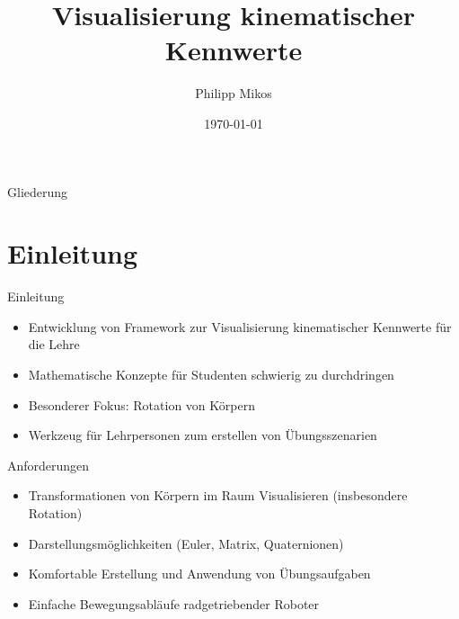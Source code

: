 \documentclass{beamer}
\title{Visualisierung kinematischer Kennwerte}
\author{Philipp Mikos}
\date{\today}
\begin{document}
\frame{\titlepage}



\begin{frame}{Gliederung}
  \tableofcontents
\end{frame}



\section{Einleitung}
\begin{frame}{Einleitung}
  \begin{itemize}
    \setlength{\itemsep}{1em}
    \item Entwicklung von Framework zur Visualisierung kinematischer Kennwerte für die Lehre
    \item Mathematische Konzepte für Studenten schwierig zu durchdringen
    \item Besonderer Fokus: Rotation von Körpern
    \item Werkzeug für Lehrpersonen zum erstellen von Übungsszenarien
  \end{itemize}
\end{frame}


%
%
%
%


\begin{frame}{Anforderungen}
  \begin{itemize}
    \setlength{\itemsep}{1em}
    \item Transformationen von Körpern im Raum Visualisieren (insbesondere Rotation)
    \item Darstellungsmöglichkeiten (Euler, Matrix, Quaternionen)
    \item Komfortable Erstellung und Anwendung von Übungsaufgaben
    \item Einfache Bewegungsabläufe radgetriebender Roboter
  \end{itemize}
\end{frame}
\end{document}
